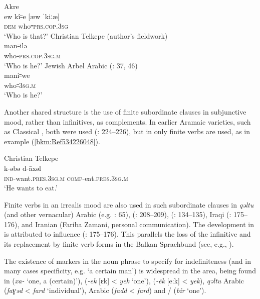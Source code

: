 \documentclass[output=paper]{langsci/langscibook}
\begin{document}
\ea\label{bkm:Ref534225894}Akre  \citep[175]{MacKenzie1961}\\
\gll ew kî꞊e \textup{[æw ˈkiːæ]}\\
     \textsc{dem} who꞊\textsc{prs.cop.3sg}\\
\glt ‘Who is that?’ 
\ex Christian Telkepe  (author’s fieldwork)\\
\gll man꞊ilə\\
     who꞊\textsc{prs.cop.3sg.m}\\
\glt ‘Who is he?’
\ex\label{bkm:Ref534225903}Jewish Arbel Arabic (\citealt{Jastrow1990book}: 37, 46) \\
\gll mani꞊we\\
     who꞊\textsc{3sg.m}\\
\glt ‘Who is he?’\z

Another shared structure is the use of finite subordinate clauses in subjunctive mood, rather than infinitives, as complements. In earlier Aramaic varieties, such as Classical , both were used (\citealt{Nöldeke1904Syriac}: 224–226), but in  only finite verbs are used, as in example (\ref{bkm:Ref534226048}).

\ea\label{bkm:Ref534226048}Christian Telkepe \\
\gll k-əbə       d-āxəl\\
    \textsc{ind-}\textup{want.}\textsc{pres}.\textsc{3sg.m} \textsc{comp}\textup{{}-eat.}\textsc{pres}.\textsc{3sg.m}\\
\glt ‘He wants to eat.’\z

Finite verbs in an irrealis mood are also used in such subordinate clauses in \textit{qəltu} (and other vernacular) Arabic (e.g. \citealt{Jastrow1990book}: 65),  (\citealt{MacKenzie1961}: 208–209),  (\citealt{MacKenzie1961}: 134–135), Iraqi  (\citealt{Bulut2007}: 175–176), and Iranian  (Fariba Zamani, personal communication). The development in  is attributed to  influence (\citealt{Bulut2007}: 175–176). This parallels the loss of the {infinitive} and its replacement by finite verb forms in the Balkan Sprachbund (see, e.g., \citealt{Joseph2009}).

The existence of markers in the {noun phrase} to specify for indefiniteness (and in many cases specificity, e.g. ‘a certain man’) is widespread in the area, being found in  (\textit{xa-} ‘one, a (certain)’),  (\textit{\nobreakdash-ek} [ɛk] < \textit{yek} `one'),  (\textit{\nobreakdash-ēk} [eːk] < \textit{yek}), \textit{qəltu} Arabic (\textit{faɣəd} < \textit{fard} `individual'),  Arabic (\textit{fadd} < \textit{fard}) and / (\textit{bir} `one').
\end{document}
